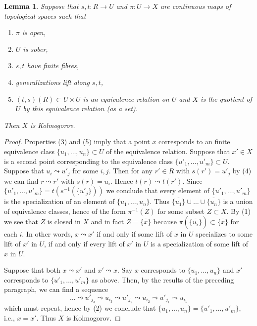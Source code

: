 \documentclass[10pt,a4paper]{amsart}
\theoremstyle{plain}
\newtheorem{lemma}[subsection]{Lemma}
\theoremstyle{definition}
\theoremstyle{remark}
\numberwithin{equation}{subsection}
\begin{document}
\begin{lemma}
\label{lemma-quotient-kolmogorov}
Suppose that $s, t : R \to U$ and $\pi : U \to X$ are continuous maps
of topological spaces such that
\begin{enumerate}
\item $\pi$ is open,
\item $U$ is sober,
\item $s, t$ have finite fibres,
\item generalizations lift along $s, t$,
\item $(t, s)(R) \subset U \times U$ is an equivalence relation on $U$ and
$X$ is the quotient of $U$ by this equivalence relation (as a set).
\end{enumerate}
Then $X$ is Kolmogorov.
\end{lemma}

\begin{proof}
Properties (3) and (5) imply that a point $x$ corresponds to an
finite equivalence class $\{u_1, \ldots, u_n\} \subset U$ of the equivalence
relation. Suppose that $x' \in X$ is a second point corresponding to
the equivalence class $\{u'_1, \ldots, u'_m\} \subset U$.
Suppose that $u_i \leadsto u'_j$ for some $i, j$. Then for any
$r' \in R$ with $s(r') = u'_j$ by (4) we can find $r \leadsto r'$
with $s(r) = u_i$. Hence $t(r) \leadsto t(r')$. Since
$\{u'_1, \ldots, u'_m\} = t(s^{-1}(\{u'_j\}))$ we conclude that
every element of $\{u'_1, \ldots, u'_m\}$ is the specialization of
an element of $\{u_1, \ldots, u_n\}$.
Thus $\overline{\{u_1\}} \cup \ldots \cup \overline{\{u_n\}}$ is
a union of equivalence classes, hence of the form $\pi^{-1}(Z)$
for some subset $Z \subset X$. By (1) we see that $Z$ is closed in $X$
and in fact $Z = \overline{\{x\}}$ because $\pi(\overline{\{u_i\}})
\subset \overline{\{x\}}$ for each $i$. In other words, $x \leadsto x'$
if and only if some lift of $x$ in $U$ specializes to some lift of
$x'$ in $U$, if and only if every lift of $x'$ in $U$ is a specialization
of some lift of $x$ in $U$.

\medskip\noindent
Suppose that both $x \leadsto x'$ and $x' \leadsto x$. Say $x$ corresponds
to $\{u_1, \ldots, u_n\}$ and $x'$ corresponds to $\{u'_1, \ldots, u'_m\}$
as above. Then, by the results of the preceding paragraph, we can find a
sequence
$$
\ldots \leadsto u'_{j_3} \leadsto u_{i_3} \leadsto u'_{j_2} \leadsto
u_{i_2} \leadsto u'_{j_1} \leadsto u_{i_1}
$$
which must repeat, hence by (2) we conclude that
$\{u_1, \ldots, u_n\} = \{u'_1, \ldots, u'_m\}$, i.e., $x = x'$.
Thus $X$ is Kolmogorov.
\end{proof}
\end{document}

